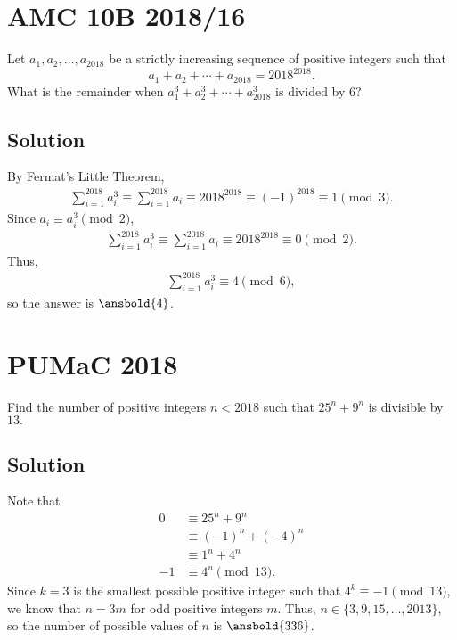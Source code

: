 \documentclass[mast]{lucky}
\begin{document}
\pagebreak\section{AMC 10B 2018/16}

Let $a_1,a_2,\dots,a_{2018}$ be a strictly increasing sequence of positive integers such that\[a_1+a_2+\cdots+a_{2018}=2018^{2018}.\]What is the remainder when $a_1^3+a_2^3+\cdots+a_{2018}^3$ is divided by $6$?

\subsection{Solution}

By Fermat's Little Theorem,
\begin{align*}
\sum_{i = 1}^{2018} a_i^3 \equiv \sum_{i = 1}^{2018} a_i \equiv 2018^{2018} \equiv (-1)^{2018} \equiv 1 \pmod 3. 
\end{align*}
Since $a_i \equiv a_i^3 \pmod 2$,
\begin{align*}
\sum_{i = 1}^{2018} a_i^3 \equiv \sum_{i = 1}^{2018} a_i \equiv 2018^{2018} \equiv 0 \pmod 2. 
\end{align*}
Thus,
\begin{align*}
\sum_{i = 1}^{2018} a_i^3 \equiv 4 \pmod 6, 
\end{align*}
so the answer is $\ansbold{4}$.

\pagebreak\section{PUMaC 2018}

Find the number of positive integers $n<2018$ such that $25^n+9^n$ is divisible by $13.$

\subsection{Solution}

Note that
\begin{align*}
0 &\equiv 25^n + 9^n \\
&\equiv (-1)^n + (-4)^n \\
&\equiv 1^n + 4^n \\
-1 &\equiv 4^n \pmod{13}.
\end{align*}
Since $k = 3$ is the smallest possible positive integer such that $4^k \equiv -1 \pmod{13}$, we know that $n = 3m$ for odd positive integers $m$. Thus, $n \in \{3, 9,15, \dots, 2013\}$, so the number of possible values of $n$ is $\ansbold{336}$.
\end{document}
